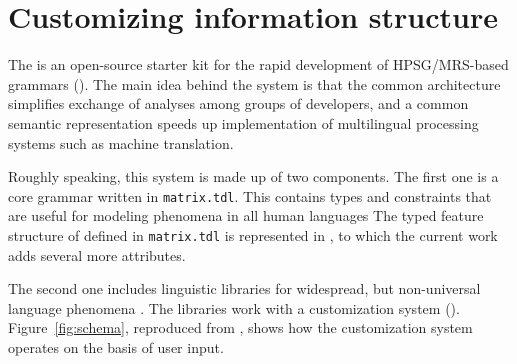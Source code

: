 \chapter{Customizing information structure}
\label{chapter11}
\setcounter{enums}{0}


The \lingo {} is an open-source starter kit for the
rapid development of HPSG/MRS-based grammars
(\citealt{bender:etal:10}).  The main idea behind the system is that
the common architecture simplifies exchange of analyses among groups
of developers, and a common semantic representation speeds up
implementation of multilingual processing systems such as machine
translation.



Roughly speaking, this system is made up of two components.  The first
one is a core grammar written in \texttt{matrix.tdl}. This contains
types and constraints that are useful for modeling phenomena in all
human languages The typed feature structure of  defined in
\texttt{matrix.tdl} is represented in , to
which the current work adds several more attributes.



\noindent The second one includes linguistic libraries for widespread,
but non-universal language phenomena
\citep{bender:flickinger:05,drellishak:09}.  The libraries work with a
customization system
().
Figure~\ref{fig:schema}, reproduced from \citet{bender:etal:10}, shows
how the \lingo {} customization system operates on
the basis of user input.



